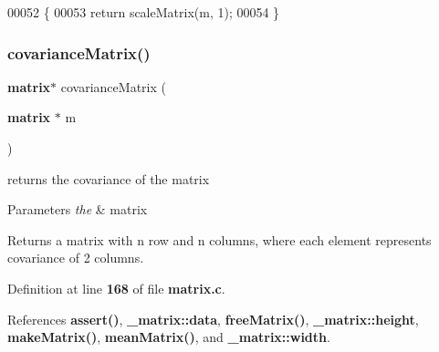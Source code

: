 \begin{DoxyCode}
00052                               \{
00053     \textcolor{keywordflow}{return} scaleMatrix(m, 1);
00054 \}
\end{DoxyCode}
\mbox{\label{matrix_8h_ae6dab569959c360cf165136a3b625edd}} 
\subsubsection{covariance\+Matrix()}
{\footnotesize\ttfamily \textbf{ matrix}$\ast$ covariance\+Matrix (\begin{DoxyParamCaption}\item[{\textbf{ matrix} $\ast$}]{m }\end{DoxyParamCaption})}



returns the covariance of the matrix 


\begin{DoxyParams}{Parameters}
{\em the} & matrix \\
\hline
\end{DoxyParams}
\begin{DoxyReturn}{Returns}
a matrix with n row and n columns, where each element represents covariance of 2 columns. 
\end{DoxyReturn}


Definition at line \textbf{ 168} of file \textbf{ matrix.\+c}.



References \textbf{ assert()}, \textbf{ \+\_\+matrix\+::data}, \textbf{ free\+Matrix()}, \textbf{ \+\_\+matrix\+::height}, \textbf{ make\+Matrix()}, \textbf{ mean\+Matrix()}, and \textbf{ \+\_\+matrix\+::width}.


